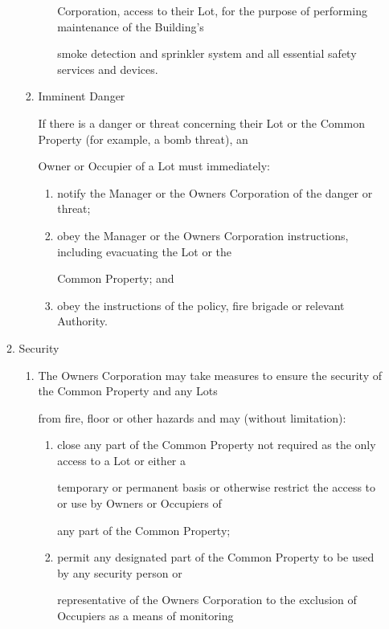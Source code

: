 \documentclass{article}
\begin{document}
\begin{enumerate}[label=\arabic*.]
\begin{enumerate}[label=\arabic{enumi}.\arabic*.]
\begin{enumerate}[label=(\arabic*)]
\begin{enumerate}[label=(\alph*)]
Corporation, access to their Lot, for the purpose of performing maintenance of the Building’s 

smoke detection and sprinkler system and all essential safety services and devices. 

\end{enumerate}
\item  Imminent Danger 

If there is a danger or threat concerning their Lot or the Common Property (for example, a bomb threat), an 

Owner or Occupier of a Lot must immediately: 

\begin{enumerate}[label=(\alph*)]
\item  notify the Manager or the Owners Corporation of the danger or threat; 

\item  obey the Manager or the Owners Corporation instructions, including evacuating the Lot or the 

Common Property; and 

\item  obey the instructions of the policy, fire brigade or relevant Authority. 

\end{enumerate}
\end{enumerate}
\item  Security 

\begin{enumerate}[label=(\arabic*)]
\item  The Owners Corporation may take measures to ensure the security of the Common Property and any Lots 

from fire, floor or other hazards and may (without limitation): 

\begin{enumerate}[label=(\alph*)]
\item  close any part of the Common Property not required as the only access to a Lot or either a 

temporary or permanent basis or otherwise restrict the access to or use by Owners or Occupiers of 

any part of the Common Property; 

\item  permit any designated part of the Common Property to be used by any security person or 

representative of the Owners Corporation to the exclusion of Occupiers as a means of monitoring 


\end{enumerate}
\end{enumerate}
\end{enumerate}
\end{enumerate}
\end{document}
